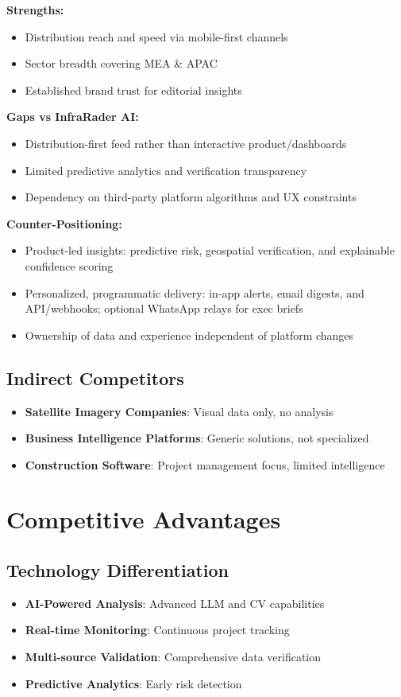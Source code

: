 \documentclass[business]{../templates/infraradar-main}
\begin{document}
\textbf{Strengths:}
\begin{itemize}
    \item Distribution reach and speed via mobile-first channels
    \item Sector breadth covering MEA \& APAC
    \item Established brand trust for editorial insights
\end{itemize}

\textbf{Gaps vs InfraRader AI:}
\begin{itemize}
    \item Distribution-first feed rather than interactive product/dashboards
    \item Limited predictive analytics and verification transparency
    \item Dependency on third-party platform algorithms and UX constraints
\end{itemize}

\textbf{Counter-Positioning:}
\begin{itemize}
    \item Product-led insights: predictive risk, geospatial verification, and explainable confidence scoring
    \item Personalized, programmatic delivery: in-app alerts, email digests, and API/webhooks; optional WhatsApp relays for exec briefs
    \item Ownership of data and experience independent of platform changes
\end{itemize}

\subsection{Indirect Competitors}
\begin{itemize}
    \item \textbf{Satellite Imagery Companies}: Visual data only, no analysis
    \item \textbf{Business Intelligence Platforms}: Generic solutions, not specialized
    \item \textbf{Construction Software}: Project management focus, limited intelligence
\end{itemize}

\section{Competitive Advantages}

\subsection{Technology Differentiation}
\begin{itemize}
    \item \textbf{AI-Powered Analysis}: Advanced LLM and CV capabilities
    \item \textbf{Real-time Monitoring}: Continuous project tracking
    \item \textbf{Multi-source Validation}: Comprehensive data verification
    \item \textbf{Predictive Analytics}: Early risk detection
\end{itemize}
\end{document}
